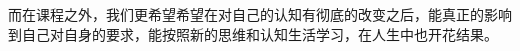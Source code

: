 \documentclass[11pt,fleqn]{book}
\makeatletter
\renewcommand{\cleardoublepage}{
	\clearpage\ifodd\c@page\else
	\hbox{}
	\vspace*{\fill}
	\thispagestyle{empty}
	\newpage
	\fi}
\numberwithin{dummy}{section}
\theoremstyle{ocrenumbox}
\theoremstyle{blacknumex}
\theoremstyle{blacknumbox}
\theoremstyle{ocrenum}
\renewcommand{\section}{\@startsection{section}{1}{\z@}
	{-4ex \@plus -1ex \@minus -.4ex}
	{1ex \@plus.2ex }
	{\normalfont\large\sffamily\bfseries}}
\makeatother
\begin{document}
而在课程之外，我们更希望希望在对自己的认知有彻底的改变之后，能真正的影响到自己对自身的要求，能按照新的思维和认知生活学习，在人生中也开花结果。




\cleardoublepage
{}
\setlength{\columnsep}{0.75cm}
\printindex

\end{document}
